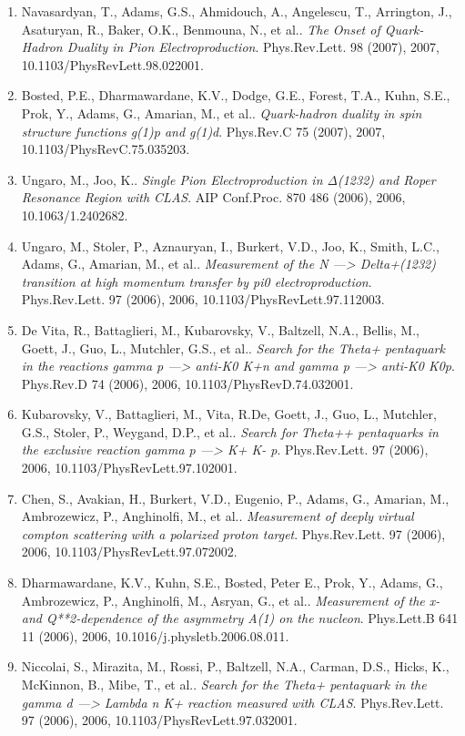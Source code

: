 \begin{enumerate}
\item Navasardyan, T., Adams, G.S., Ahmidouch, A., Angelescu, T., Arrington, J., Asaturyan, R., Baker, O.K., Benmouna, N., et al.. \textit{The Onset of Quark-Hadron Duality in Pion Electroproduction}. Phys.Rev.Lett. 98 (2007), 2007, 10.1103/PhysRevLett.98.022001.
\item Bosted, P.E., Dharmawardane, K.V., Dodge, G.E., Forest, T.A., Kuhn, S.E., Prok, Y., Adams, G., Amarian, M., et al.. \textit{Quark-hadron duality in spin structure functions g(1)p and g(1)d}. Phys.Rev.C 75 (2007), 2007, 10.1103/PhysRevC.75.035203.
\item Ungaro, M., Joo, K.. \textit{Single Pion Electroproduction in Δ(1232) and Roper Resonance Region with CLAS}. AIP Conf.Proc. 870 486 (2006), 2006, 10.1063/1.2402682.
\item Ungaro, M., Stoler, P., Aznauryan, I., Burkert, V.D., Joo, K., Smith, L.C., Adams, G., Amarian, M., et al.. \textit{Measurement of the N ---> Delta+(1232) transition at high momentum transfer by pi0 electroproduction}. Phys.Rev.Lett. 97 (2006), 2006, 10.1103/PhysRevLett.97.112003.
\item De Vita, R., Battaglieri, M., Kubarovsky, V., Baltzell, N.A., Bellis, M., Goett, J., Guo, L., Mutchler, G.S., et al.. \textit{Search for the Theta+ pentaquark in the reactions gamma p ---> anti-K0 K+n and gamma p ---> anti-K0 K0p}. Phys.Rev.D 74 (2006), 2006, 10.1103/PhysRevD.74.032001.
\item Kubarovsky, V., Battaglieri, M., Vita, R.De, Goett, J., Guo, L., Mutchler, G.S., Stoler, P., Weygand, D.P., et al.. \textit{Search for Theta++ pentaquarks in the exclusive reaction gamma p ---> K+ K- p}. Phys.Rev.Lett. 97 (2006), 2006, 10.1103/PhysRevLett.97.102001.
\item Chen, S., Avakian, H., Burkert, V.D., Eugenio, P., Adams, G., Amarian, M., Ambrozewicz, P., Anghinolfi, M., et al.. \textit{Measurement of deeply virtual compton scattering with a polarized proton target}. Phys.Rev.Lett. 97 (2006), 2006, 10.1103/PhysRevLett.97.072002.
\item Dharmawardane, K.V., Kuhn, S.E., Bosted, Peter E., Prok, Y., Adams, G., Ambrozewicz, P., Anghinolfi, M., Asryan, G., et al.. \textit{Measurement of the x- and Q**2-dependence of the asymmetry A(1) on the nucleon}. Phys.Lett.B 641 11 (2006), 2006, 10.1016/j.physletb.2006.08.011.
\item Niccolai, S., Mirazita, M., Rossi, P., Baltzell, N.A., Carman, D.S., Hicks, K., McKinnon, B., Mibe, T., et al.. \textit{Search for the Theta+ pentaquark in the gamma d ---> Lambda n K+ reaction measured with CLAS}. Phys.Rev.Lett. 97 (2006), 2006, 10.1103/PhysRevLett.97.032001.

\end{enumerate}

